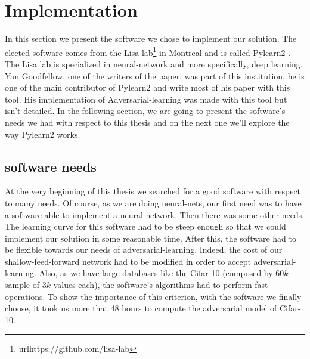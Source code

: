 
\chapter{Implementation}

	In this section we present the software we chose to implement our solution. The elected software comes from the Lisa-lab\footnote{url{https://github.com/lisa-lab}} in Montreal and is called Pylearn2 \cite{pylearn2_arxiv_2013}. The Lisa lab is specialized in neural-network and more specifically, deep learning. Yan Goodfellow, one of the writers of the paper\cite{goodfellow2014explaining}, was part of this institution, he is one of the main contributor of Pylearn2 and write most of his paper with this tool. His implementation of Adversarial-learning was made with this tool but isn't detailed. In the following section, we are going to present the software's needs we had with respect to this thesis and on the next one we'll explore the way Pylearn2 works.

	\section{software needs}
		At the very beginning of this thesis we searched for a good software with respect to many needs.
		Of course, as we are doing neural-nets, our first need was to have a software able to implement a neural-network. Then there was some other needs. The learning curve for this software had to be steep enough so that we could implement our solution in some reasonable time. After this, the software had to be flexible towards our needs of adversarial-learning. Indeed, the cost of our shallow-feed-forward network had to be modified in order to accept adversarial-learning. Also, as we have large databases like the Cifar-10 (composed by $60k$ sample of $3k$ values each), the software's algorithms had to perform fast operations. To show the importance of this criterion, with the software we finally choose, it took us more that 48 hours to compute the adversarial model of Cifar-10.

